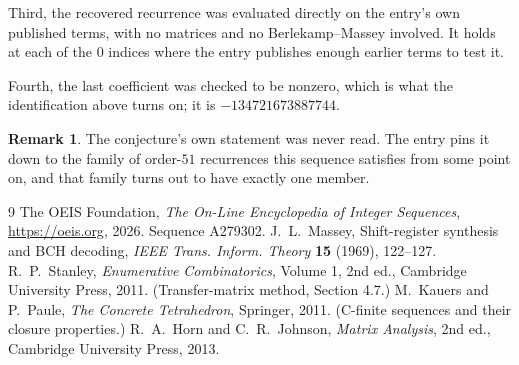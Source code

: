\documentclass[11pt,a4paper]{article}
\theoremstyle{plain}
\theoremstyle{definition}
\newtheorem{remark}[theorem]{Remark}
\begin{document}
Third, the recovered recurrence was evaluated directly on the entry's own published terms, with
no matrices and no Berlekamp--Massey involved. It holds at each of the $0$ indices where
the entry publishes enough earlier terms to test it.

Fourth, the last coefficient was checked to be nonzero, which is what the identification above
turns on; it is $-134721673887744$.

\begin{remark}
The conjecture's own statement was never read. The entry pins it down to the family of
order-$51$ recurrences this sequence satisfies from some point on, and that family turns
out to have exactly one member.
\end{remark}

\begin{thebibliography}{9}
 The OEIS Foundation, \emph{The On-Line Encyclopedia of Integer
Sequences}, \url{https://oeis.org}, 2026. Sequence A279302.
 J.~L.~Massey, Shift-register synthesis and BCH decoding, \emph{IEEE
Trans. Inform. Theory} \textbf{15} (1969), 122--127.
 R.~P.~Stanley, \emph{Enumerative Combinatorics}, Volume 1, 2nd ed.,
Cambridge University Press, 2011. (Transfer-matrix method, Section 4.7.)
 M.~Kauers and P.~Paule, \emph{The Concrete Tetrahedron}, Springer, 2011.
(C-finite sequences and their closure properties.)
 R.~A.~Horn and C.~R.~Johnson, \emph{Matrix Analysis}, 2nd ed., Cambridge
University Press, 2013.
\end{thebibliography}
\end{document}
